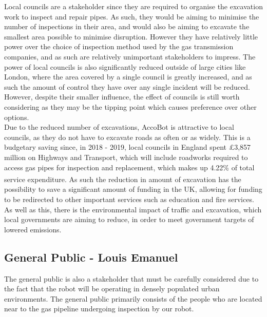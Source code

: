\documentclass[11pt]{article}		%
\newcommand{\supercite}[1]{\textsuperscript{\cite{#1}}}		%
\begin{document}
			Local councils are a stakeholder since they are required to organise the excavation work to inspect and repair pipes.
			As such, they would be aiming to minimise the number of inspections in their area, and would also be aiming to excavate the smallest area possible to minimise disruption.
			However they have relatively little power over the choice of inspection method used by the gas transmission companies, and as such are relatively unimportant stakeholders to impress.
			The power of local councils is also significantly reduced outside of large cities like London, where the area covered by a single council is greatly increased, and as such the amount of control they have over any single incident will be reduced.
			However, despite their smaller influence, the effect of councils is still worth considering as they may be the tipping point which causes preference over other options.
			\\
			Due to the reduced number of excavations, AccoBot is attractive to local councils, as they do not have to excavate roads as often or as widely.
			This is a budgetary saving since, in 2018 - 2019, local councils in England spent £3,857 million on Highways and Transport, which will include roadworks required to access gas pipes for inspection and replacement, which makes up 4.22\% of total service expenditure\supercite{ministry2020local}.
			As such the reduction in amount of excavation has the possibility to save a significant amount of funding in the UK, allowing for funding to be redirected to other important services such as education and fire services.
			As well as this, there is the environmental impact of traffic and excavation, which local governments are aiming to reduce, in order to meet government targets of lowered emissions.
		
		\subsection[General Public]{General Public - Louis Emanuel}
			The general public is also a stakeholder that must be carefully considered due to the fact that the robot will be operating in densely populated urban environments. The general public primarily consists of the people who are located near to the gas pipeline undergoing inspection by our robot.
			
\end{document}

